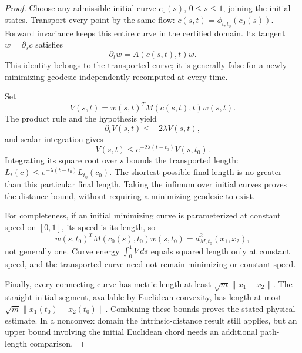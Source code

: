 \begin{proof}
Choose any admissible initial curve $c_0(s)$, $0\leq s\leq1$, joining the initial states. Transport every point by the same flow: $c(s,t)=\phi_{t,t_0}(c_0(s))$. Forward invariance keeps this entire curve in the certified domain. Its tangent $w=\partial_sc$ satisfies
\begin{equation}
\partial_tw=A(c(s,t),t)w.
\label{eq:ch4:tangent-evolution}
\end{equation}
This identity belongs to the transported curve; it is generally false for a newly minimizing geodesic independently recomputed at every time.

Set
\begin{equation}
V(s,t)=w(s,t)^TM(c(s,t),t)w(s,t).
\label{eq:ch4:geodesic-V}
\end{equation}
The product rule and the hypothesis yield
\begin{equation}
\partial_tV(s,t)\leq-2\lambda V(s,t),
\label{eq:ch4:Vdot-bound}
\end{equation}
and scalar integration gives
\begin{equation}
V(s,t)\leq e^{-2\lambda(t-t_0)}V(s,t_0).
\label{eq:ch4:gronwall-result}
\end{equation}
Integrating its square root over $s$ bounds the transported length:
$L_t(c)\leq e^{-\lambda(t-t_0)}L_{t_0}(c_0)$.
The shortest possible final length is no greater than this particular final length. Taking the infimum over initial curves proves the distance bound, without requiring a minimizing geodesic to exist.

For completeness, if an initial minimizing curve is parameterized at constant speed on $[0,1]$, its speed is its length, so
\begin{equation}
w(s,t_0)^TM(c_0(s),t_0)w(s,t_0)=d_{M,t_0}^2(x_1,x_2),
\label{eq:ch4:unit-tangent}
\end{equation}
not generally one. Curve energy $\int_0^1V\,ds$ equals squared length only at constant speed, and the transported curve need not remain minimizing or constant-speed.

Finally, every connecting curve has metric length at least $\sqrt{\underline m}\|x_1-x_2\|$. The straight initial segment, available by Euclidean convexity, has length at most $\sqrt{\overline m}\|x_1(t_0)-x_2(t_0)\|$. Combining these bounds proves the stated physical estimate. In a nonconvex domain the intrinsic-distance result still applies, but an upper bound involving the initial Euclidean chord needs an additional path-length comparison.
\end{proof}

